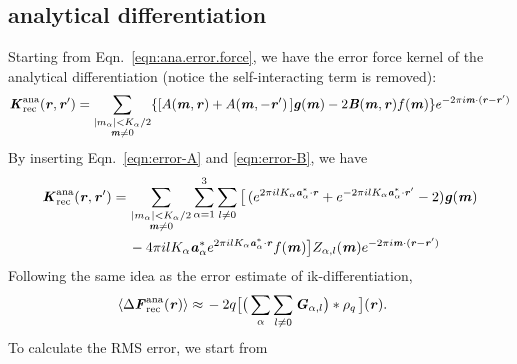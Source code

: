 \documentclass[aps,pre,preprint,unsortedaddress]{revtex4}
\renewcommand{\v}[1]{\textbf{\textit{#1}}}
\begin{document}
\subsection{analytical differentiation}
Starting from Eqn.~\eqref{eqn:ana.error.force}, we have the error force kernel
of the analytical differentiation (notice the self-interacting term is removed):
\begin{align}
  \v K^{\textrm{ana}}_{\textrm{rec}}(\v r, \v r')
  =
  \sum_{
    \begin{subarray}{c}
      \vert m_{\alpha}\vert < K_\alpha/2\\
      \v m\neq 0
    \end{subarray}}
  \{
  [A(\v m, \v r) + A(\v m,-\v r')\,]
  \v g(\v m) -
  2\v B(\v m,\v r) f(\v m)
  \}
  e^{-2\pi i\v m\cdot(\v r-\v r')}
\end{align}
By inserting Eqn.~\eqref{eqn:error-A} and \eqref{eqn:error-B}, we have
\begin{align}\nonumber
  \v K^{\textrm{ana}}_{\textrm{rec}}(\v r, \v r')
  =\,&
  \sum_{
    \begin{subarray}{c}
      \vert m_{\alpha}\vert < K_\alpha/2\\
      \v m\neq 0
    \end{subarray}}
  \sum_{\alpha=1}^3\sum_{l\neq 0}
  \big[
  \,(
  e^{2\pi i l K_\alpha\v a^\ast_\alpha\cdot \v r} +
  e^{-2\pi i l K_\alpha\v a^\ast_\alpha\cdot \v r'}
  - 2
  )
  \v g(\v m)
  \\ 
  \,&
  - 4\pi i l K_\alpha\v a_\alpha^\ast e^{2\pi i l K_\alpha\v a^\ast_\alpha\cdot \v r}
  f(\v m)
  \big]
  Z_{\alpha,l}(\v m)
  e^{-2\pi i\v m\cdot(\v r-\v r')}  
\end{align}
Following  the same idea as the error estimate of  ik-differentiation,
\begin{align}
  \langle\Delta\v F^{\textrm{ana}}_{\textrm{rec}}(\v r)\rangle
  \approx\,&
  -2q
  \big[
  \big(
  \sum_{\alpha}\sum_{l\neq 0}\v G_{\alpha,l}
  \big)
  \ast\rho_q\,
  \big] (\v r).
\end{align}
To calculate the RMS error, we start from
\end{document}
